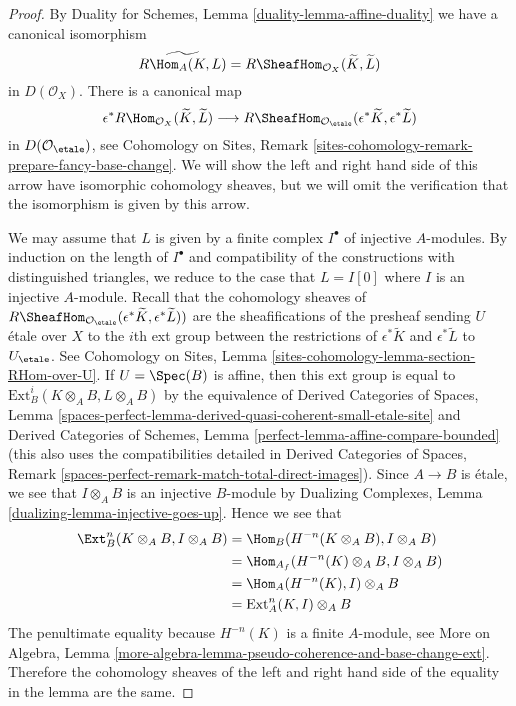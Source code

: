 \begin{proof}
By Duality for Schemes, Lemma \ref{duality-lemma-affine-duality}
we have a canonical isomorphism
$$
\widetilde{R\Hom_A(K, L)} =
R\SheafHom_{\mathcal{O}_X}(\widetilde{K}, \widetilde{L})
$$
in $D(\mathcal{O}_X)$. There is a canonical map
$$
\epsilon^*R\Hom_{\mathcal{O}_X}(\widetilde{K}, \widetilde{L})
\longrightarrow
R\SheafHom_{\mathcal{O}_\etale}(\epsilon^*\widetilde{K},
\epsilon^*\widetilde{L})
$$
in $D(\mathcal{O}_\etale)$, see Cohomology on Sites, Remark
\ref{sites-cohomology-remark-prepare-fancy-base-change}.
We will show the left and right hand side of this arrow
have isomorphic cohomology sheaves, but we will omit the
verification that the isomorphism is given by this arrow.

\medskip\noindent
We may assume that $L$ is given by a finite complex $I^\bullet$
of injective $A$-modules. By induction on the length of $I^\bullet$
and compatibility of the constructions with distinguished triangles,
we reduce to the case that $L = I[0]$ where $I$ is an injective $A$-module.
Recall that the cohomology sheaves of
$R\SheafHom_{\mathcal{O}_\etale}(\epsilon^*\widetilde{K},
\epsilon^*\widetilde{L}))$
are the sheafifications of the presheaf sending $U$ \'etale
over $X$ to the $i$th ext group between the restrictions of
$\epsilon^*\widetilde{K}$ and $\epsilon^*\widetilde{L}$
to $U_\etale$. See
Cohomology on Sites, Lemma
\ref{sites-cohomology-lemma-section-RHom-over-U}.
If $U = \Spec(B)$ is affine, then this ext group
is equal to $\text{Ext}^i_B(K \otimes_A B, L \otimes_A B)$
by the equivalence of
Derived Categories of Spaces, Lemma
\ref{spaces-perfect-lemma-derived-quasi-coherent-small-etale-site} and
Derived Categories of Schemes, Lemma
\ref{perfect-lemma-affine-compare-bounded}
(this also uses the compatibilities detailed in
Derived Categories of Spaces, Remark
\ref{spaces-perfect-remark-match-total-direct-images}).
Since $A \to B$ is \'etale, we see that
$I \otimes_A B$ is an injective $B$-module
by Dualizing Complexes, Lemma \ref{dualizing-lemma-injective-goes-up}.
Hence we see that
\begin{align*}
\Ext^n_B(K \otimes_A B, I \otimes_A B)
& =
\Hom_B(H^{-n}(K \otimes_A B), I \otimes_A B) \\
& =
\Hom_{A_f}(H^{-n}(K) \otimes_A B, I \otimes_A B) \\
& =
\Hom_A(H^{-n}(K), I) \otimes_A B \\
& =
\text{Ext}^n_A(K, I) \otimes_A B
\end{align*}
The penultimate equality because $H^{-n}(K)$ is a finite $A$-module, see
More on Algebra, Lemma
\ref{more-algebra-lemma-pseudo-coherence-and-base-change-ext}.
Therefore the cohomology sheaves of the left and right hand
side of the equality in the lemma are the same.
\end{proof}

